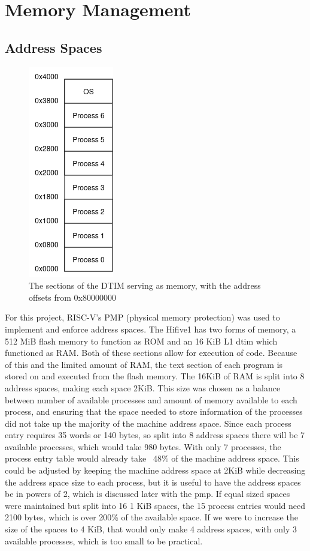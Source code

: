 \section{Memory Management}
\subsection{Address Spaces}
\begin{figure}[H]
    \includegraphics[height=0.3\textheight]{figures/dtim.png}
    \centering
    \caption[Layout of memory]{The sections of the DTIM serving as memory, with the address offsets from 0x80000000}
\end{figure}
For this project, RISC-V's PMP (physical memory protection) was used to implement and enforce address spaces. The Hifive1 has two forms of memory, a 512 MiB flash memory to function as ROM and an 16 KiB L1 \ac{dtim} which functioned as RAM. Both of these sections allow for execution of code. Because of this and the limited amount of RAM, the text section of each program is stored on and executed from the flash memory. The 16KiB of RAM is split into 8 address spaces, making each space 2KiB. This size was chosen as a balance between number of available processes and amount of memory available to each process, and ensuring that the space needed to store information of the processes did not take up the majority of the machine address space. Since each process entry requires 35 words or 140 bytes, so split into 8 address spaces there will be 7 available processes, which would take 980 bytes. With only 7 processes, the process entry table would already take ~48\% of the machine address space. This could be adjusted by keeping the machine address space at 2KiB while decreasing the address space size to each process, but it is useful to have the address spaces be in powers of 2, which is discussed later with the \ac{pmp}. If equal sized spaces were maintained but split into 16 1 KiB spaces, the 15 process entries would need 2100 bytes, which is over 200\% of the available space. If we were to increase the size of the spaces to 4 KiB, that would only make 4 address spaces, with only 3 available processes, which is too small to be practical.

